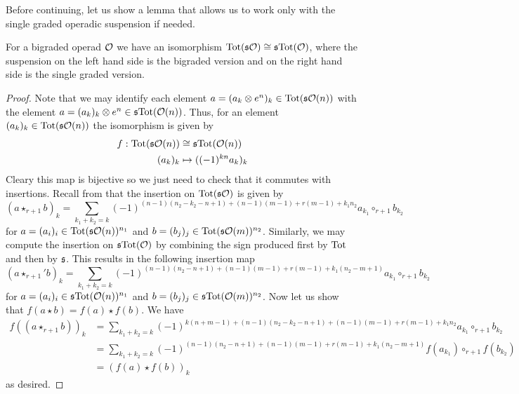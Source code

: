 \documentclass[join.tex]{subfiles}
\begin{document}
Before continuing, let us show a lemma that allows us to work only with the single graded operadic suspension if needed.
\begin{propo}\label{extrasign}
For a bigraded operad ${\mathcal O}$ we have an isomorphism $\mathrm{Tot}(\mathfrak{s}{\mathcal O})\cong \mathfrak{s} \mathrm{Tot}({\mathcal O})$, where the suspension on the left hand side is the bigraded version and on the right hand side is the single graded version. 
\end{propo}
\begin{proof}
 Note that we may identify each element $a=(a_k\otimes e^n )_k\in\mathrm{Tot}(\mathfrak{s}{\mathcal O}(n))$ with the element $a=(a_k)_k\otimes e^n\in\mathfrak{s}\mathrm{Tot}({\mathcal O}(n))$. Thus, for an element $(a_k)_k\in \mathrm{Tot}(\mathfrak{s}{\mathcal O}(n))$ the isomorphism is given by
\begin{align*}
f:\mathrm{Tot}(\mathfrak{s}{\mathcal O}(n))&\cong \mathfrak{s} \mathrm{Tot}({\mathcal O}(n))\\
(a_k)_k&\mapsto ((-1)^{kn}a_k)_k
\end{align*}
Cleary this map is bijective so we just need to check that it commutes with insertions. Recall from  that the insertion on $\mathrm{Tot}(\mathfrak{s}{\mathcal O})$ is given by
\begin{equation*}
(a\star_{r+1} b)_k=\sum_{k_1+k_2=k}(-1)^{(n-1)(n_2-k_2-n+1)+(n-1)(m-1)+r(m-1)+k_1n_2}a_{k_1}\circ_{r+1}b_{k_2}
\end{equation*}
for $a=(a_i)_i\in \mathrm{Tot}(\mathfrak{s}{\mathcal O}(n))^{n_1}$ and $b=(b_j)_j\in \mathrm{Tot}(\mathfrak{s}{\mathcal O}(m))^{n_2}$. Similarly, we may compute the insertion on $\mathfrak{s}\mathrm{Tot}({\mathcal O})$ by combining the sign produced first by $\mathrm{Tot}$ and then by $\mathfrak{s}$. This results in  the following insertion map 
\begin{equation*}
(a\star_{r+1}' b)_k=\sum_{k_1+k_2=k}(-1)^{(n-1)(n_2-n+1)+(n-1)(m-1)+r(m-1)+k_1(n_2-m+1)}a_{k_1}\circ_{r+1}b_{k_2}
\end{equation*}
for $a=(a_i)_i\in \mathfrak{s}\mathrm{Tot}({\mathcal O}(n))^{n_1}$ and $b=(b_j)_j\in \mathfrak{s}\mathrm{Tot}({\mathcal O}(m))^{n_2}$. Now let us show that $f(a\star b)=f(a)\star f(b)$. We have
\begin{align*}
f((a\star_{r+1} b))_k&=\sum_{k_1+k_2=k}(-1)^{k(n+m-1)+(n-1)(n_2-k_2-n+1)+(n-1)(m-1)+r(m-1)+k_1n_2}a_{k_1}\circ_{r+1}b_{k_2}\\
&=\sum_{k_1+k_2=k}(-1)^{(n-1)(n_2-n+1)+(n-1)(m-1)+r(m-1)+k_1(n_2-m+1)}f(a_{k_1})\circ_{r+1}f(b_{k_2})\\
&=(f(a)\star f(b))_k
\end{align*}
as desired.
\end{proof}
\end{document}
